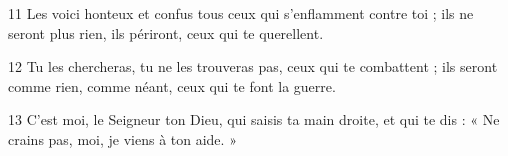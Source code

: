 
11 Les voici honteux et confus tous ceux qui s’enflamment contre toi ; ils ne seront plus rien, ils périront, ceux qui te querellent.

12 Tu les chercheras, tu ne les trouveras pas, ceux qui te combattent ; ils seront comme rien, comme néant, ceux qui te font la guerre.

13 C’est moi, le Seigneur ton Dieu, qui saisis ta main droite, et qui te dis : « Ne crains pas, moi, je viens à ton aide. »
